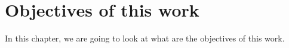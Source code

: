 \chapter{Objectives of this work}

\label{kap:workObjectives} %

In this chapter, we are going to look at what are the objectives of this work.
